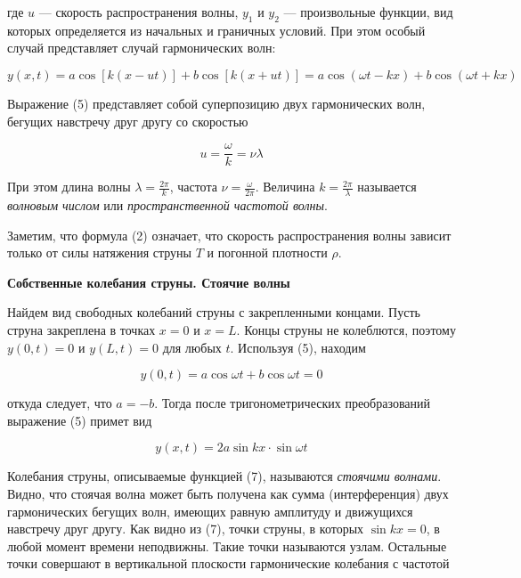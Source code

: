 \documentclass[14pt]{article}
\begin{document}
\noindent где $u$ --- скорость распространения волны, $y_1$ и $y_2$ --- произвольные функции, вид которых определяется из начальных и граничных условий. При этом особый случай представляет случай гармонических волн:

\begin{center}
\begin{equation}
y(x, t) = a\cos[k(x - ut)] + b\cos[k(x + ut)] = a\cos(\omega t - kx) + b\cos(\omega t + kx)
\end{equation}
\end{center}

\noindent Выражение (5) представляет собой суперпозицию двух гармонических волн, бегущих навстречу друг другу со скоростью 

\begin{center}
\begin{equation}
u = \frac{\omega}{k} = \nu\lambda
\end{equation}
\end{center}

При этом длина волны $\lambda = \frac{2\pi}{k}$, частота $\nu = \frac{\omega}{2\pi}$. Величина $k = \frac{2\pi}{\lambda}$ называется \textsl{волновым числом} или \textsl{пространственной частотой волны}.

Заметим, что формула (2) означает, что скорость распространения волны зависит только от силы натяжения струны $T$ и погонной плотности $\rho$.

\vspace{1cm}
\textbf{Собственные колебания струны. Стоячие волны}

Найдем вид свободных колебаний струны с закрепленными концами. Пусть струна закреплена в точках $x = 0$ и $x = L$. Концы струны не колеблются, поэтому $y(0, t) = 0$ и $y(L, t) = 0$ для любых $t$. Используя (5), находим

$$y(0, t) = a\cos\omega t + b\cos\omega t = 0$$

\noindent откуда следует, что $a = -b$. Тогда после тригонометрических преобразований выражение (5) примет вид

\begin{center}
\begin{equation}
y(x, t) = 2a\sin kx \cdot \sin\omega t
\end{equation}
\end{center}

Колебания струны, описываемые функцией (7), называются \textsl{стоячими волнами}. Видно, что стоячая волна может быть получена как сумма (интерференция) двух гармонических бегущих волн, имеющих равную амплитуду и движущихся навстречу друг другу. Как видно из (7), точки струны, в которых $\sin kx = 0$, в любой момент времени неподвижны. Такие точки называются узлам. Остальные точки совершают в вертикальной плоскости гармонические колебания с частотой
\end{document}
